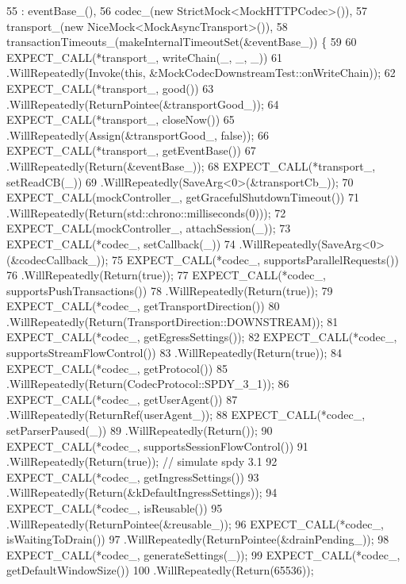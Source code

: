 \begin{DoxyCode}
55     : eventBase_(),
56       codec_(\textcolor{keyword}{new} StrictMock<MockHTTPCodec>()),
57       transport_(\textcolor{keyword}{new} NiceMock<MockAsyncTransport>()),
58       transactionTimeouts_(makeInternalTimeoutSet(&eventBase_)) \{
59 
60     EXPECT\_CALL(*transport_, writeChain(\_, \_, \_))
61       .WillRepeatedly(Invoke(\textcolor{keyword}{this}, &MockCodecDownstreamTest::onWriteChain));
62     EXPECT\_CALL(*transport_, good())
63       .WillRepeatedly(ReturnPointee(&transportGood_));
64     EXPECT\_CALL(*transport_, closeNow())
65       .WillRepeatedly(Assign(&transportGood_, \textcolor{keyword}{false}));
66     EXPECT\_CALL(*transport_, getEventBase())
67       .WillRepeatedly(Return(&eventBase_));
68     EXPECT\_CALL(*transport_, setReadCB(\_))
69       .WillRepeatedly(SaveArg<0>(&transportCb_));
70     EXPECT\_CALL(mockController_, getGracefulShutdownTimeout())
71       .WillRepeatedly(Return(std::chrono::milliseconds(0)));
72     EXPECT\_CALL(mockController_, attachSession(\_));
73     EXPECT\_CALL(*codec_, setCallback(\_))
74       .WillRepeatedly(SaveArg<0>(&codecCallback_));
75     EXPECT\_CALL(*codec_, supportsParallelRequests())
76       .WillRepeatedly(Return(\textcolor{keyword}{true}));
77     EXPECT\_CALL(*codec_, supportsPushTransactions())
78       .WillRepeatedly(Return(\textcolor{keyword}{true}));
79     EXPECT\_CALL(*codec_, getTransportDirection())
80       .WillRepeatedly(Return(TransportDirection::DOWNSTREAM));
81     EXPECT\_CALL(*codec_, getEgressSettings());
82     EXPECT\_CALL(*codec_, supportsStreamFlowControl())
83       .WillRepeatedly(Return(\textcolor{keyword}{true}));
84     EXPECT\_CALL(*codec_, getProtocol())
85       .WillRepeatedly(Return(CodecProtocol::SPDY\_3\_1));
86     EXPECT\_CALL(*codec_, getUserAgent())
87       .WillRepeatedly(ReturnRef(userAgent_));
88     EXPECT\_CALL(*codec_, setParserPaused(\_))
89       .WillRepeatedly(Return());
90     EXPECT\_CALL(*codec_, supportsSessionFlowControl())
91       .WillRepeatedly(Return(\textcolor{keyword}{true})); \textcolor{comment}{// simulate spdy 3.1}
92     EXPECT\_CALL(*codec_, getIngressSettings())
93       .WillRepeatedly(Return(&kDefaultIngressSettings));
94     EXPECT\_CALL(*codec_, isReusable())
95       .WillRepeatedly(ReturnPointee(&reusable_));
96     EXPECT\_CALL(*codec_, isWaitingToDrain())
97       .WillRepeatedly(ReturnPointee(&drainPending_));
98     EXPECT\_CALL(*codec_, generateSettings(\_));
99     EXPECT\_CALL(*codec_, getDefaultWindowSize())
100       .WillRepeatedly(Return(65536));

\end{DoxyCode}
